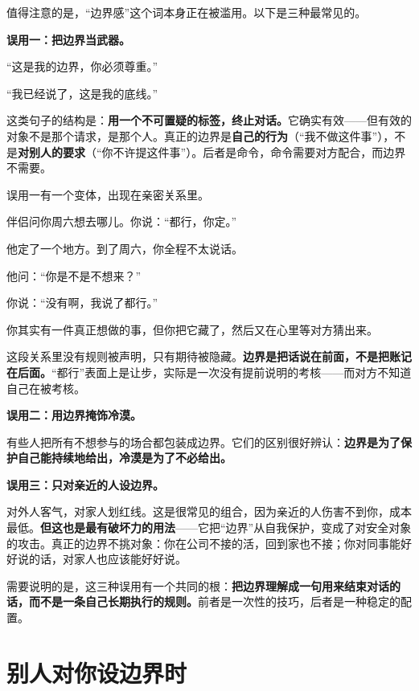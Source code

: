 值得注意的是，“边界感”这个词本身正在被滥用。以下是三种最常见的。

\textbf{误用一：把边界当武器。}

\begin{mdquote}
“这是我的边界，你必须尊重。”\par
“我已经说了，这是我的底线。”
\end{mdquote}

这类句子的结构是：\textbf{用一个不可置疑的标签，终止对话。}它确实有效——但有效的对象不是那个请求，是那个人。真正的边界是\textbf{自己的行为}（“我不做这件事”），不是\textbf{对别人的要求}（“你不许提这件事”）。后者是命令，命令需要对方配合，而边界不需要。

误用一有一个变体，出现在亲密关系里。

\par
\begin{mdquote}
伴侣问你周六想去哪儿。你说：“都行，你定。”\par
他定了一个地方。到了周六，你全程不太说话。\par
他问：“你是不是不想来？”\par
你说：“没有啊，我说了都行。”\par
\vspace{0.3\baselineskip}
你其实有一件真正想做的事，但你把它藏了，然后又在心里等对方猜出来。
\end{mdquote}

这段关系里没有规则被声明，只有期待被隐藏。\textbf{边界是把话说在前面，不是把账记在后面。}“都行”表面上是让步，实际是一次没有提前说明的考核——而对方不知道自己在被考核。

\textbf{误用二：用边界掩饰冷漠。}

有些人把所有不想参与的场合都包装成边界。它们的区别很好辨认：\textbf{边界是为了保护自己能持续地给出，冷漠是为了不必给出。}

\textbf{误用三：只对亲近的人设边界。}

对外人客气，对家人划红线。这是很常见的组合，因为亲近的人伤害不到你，成本最低。\textbf{但这也是最有破坏力的用法}——它把“边界”从自我保护，变成了对安全对象的攻击。真正的边界不挑对象：你在公司不接的活，回到家也不接；你对同事能好好说的话，对家人也应该能好好说。

需要说明的是，这三种误用有一个共同的根：\textbf{把边界理解成一句用来结束对话的话，而不是一条自己长期执行的规则。}前者是一次性的技巧，后者是一种稳定的配置。

\section{别人对你设边界时}

